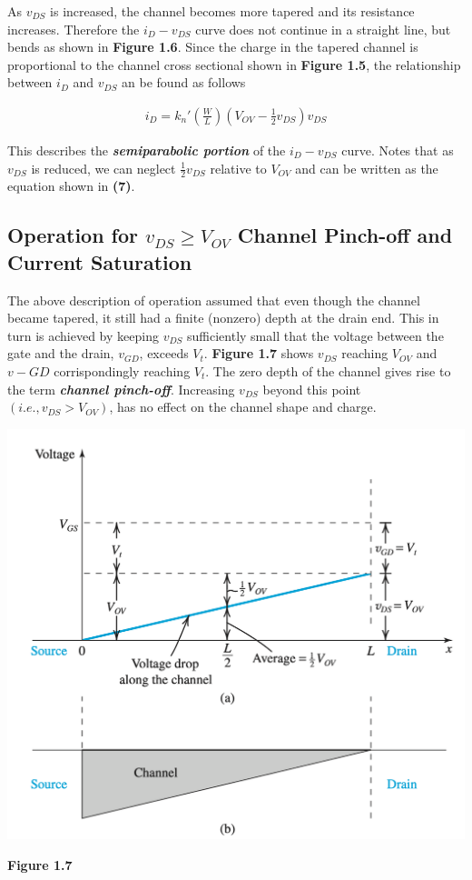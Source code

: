 \documentclass[12pt]{article}
\begin{document}
    As $v_{DS}$ is increased, the channel becomes more tapered and its resistance
    increases. Therefore the $i_D-v_{DS}$ curve does not continue in a straight 
    line, but bends as shown in \textbf{Figure 1.6}. Since the charge in the 
    tapered channel is proportional to the channel cross sectional shown in 
    \textbf{Figure 1.5}, the relationship between $i_D$ and $v_{DS}$ an be found
    as follows

    \begin{align}
        i_D = k_n'\left(\frac{W}{L}\right)\left(V_{OV} - \frac{1}{2}v_{DS}\right)v_{DS}
    \end{align} 

    This describes the \textit{\textbf{semiparabolic portion}} of the $i_D-v_{DS}$ curve.
    Notes that as $v_{DS}$ is reduced, we can neglect $\frac{1}{2}v_{DS}$ relative to 
    $V_{OV}$ and can be written as the equation shown in \textbf{(7)}.

    \subsection*{Operation for $v_{DS} \geq V_{OV}$ Channel Pinch-off and Current Saturation}

    The above description of operation assumed that even though the channel became
    tapered, it still had a finite (nonzero) depth at the drain end. This in turn is achieved 
    by keeping $v_{DS}$ sufficiently small that the voltage between the gate and the drain, 
    $v_{GD}$, exceeds $V_t$. \textbf{Figure 1.7} shows $v_{DS}$ reaching $V_{OV}$ and $v-{GD}$ 
    corrispondingly reaching $V_t$. The zero depth of the channel gives rise to the term 
    \textit{\textbf{channel pinch-off}}. Increasing $v_{DS}$ beyond this point 
    $(i.e., v_{DS} > V_{OV})$, has no effect on the channel shape and charge.

    \begin{center}
        \centerline{\includegraphics[scale=0.6]{figures/fig7.png}}
        \textbf{Figure 1.7}
    \end{center}
\end{document}
